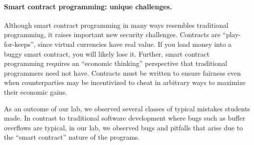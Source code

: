 \documentclass[10pt,twocolumn,letterpaper]{article}
\newcommand{\elaine}[1]{{\color{red}{[elaine: #1]}}}
\newcommand{\ignore}[1]{}
\begin{document}
\ignore{
The first part of this lab consists of step-by-step examples illustrating basic design of functional smart contracts. We highly recommend you take a hands-on approach, and interact with these smart contract examples using the Ethereum simulator! The accompanying materials to everything you need to get started with experimenting, including  a virtual machine image, basic instructions, and a language guide.

The second part of this lab focuses on designing smart contracts that achieve their intended goals, and are robust to attacks. 
Although our lab makes us of a simulator, the smart contracts you write can also be used in the live Ethereum network\footnote{At the time of this writing, the only live Ethereum network is a test network, since the main network has not yet launched.} The basic concepts we discuss apply to other cryptocurrencies as well (including Bitcoin), so most of what you learn will be transferable.
}

\paragraph{Smart contract programming: unique challenges.}
Although smart contract programming in many ways resembles 
traditional programming, 
it raises important new security challenges. 
Contracts are ``play-for-keeps'', since virtual currencies have real value. 
If you load money into a buggy smart contract, you will likely lose it. 
Further, smart contract programming requires
an ``economic thinking'' perspective that traditional
programmers need not have. 
Contracts must be written to ensure fairness even when
counterparties may be incentivized to cheat in arbitrary ways to maximize
their economic gains.




As an outcome of our lab, we observed several classes
of typical mistakes students made. 
In contrast to  
traditional software development where 
bugs such as buffer overflows are typical, 
in our lab, we observed 
bugs and pitfalls that arise due to 
the ``smart contract'' nature of the programs. 
\end{document}
